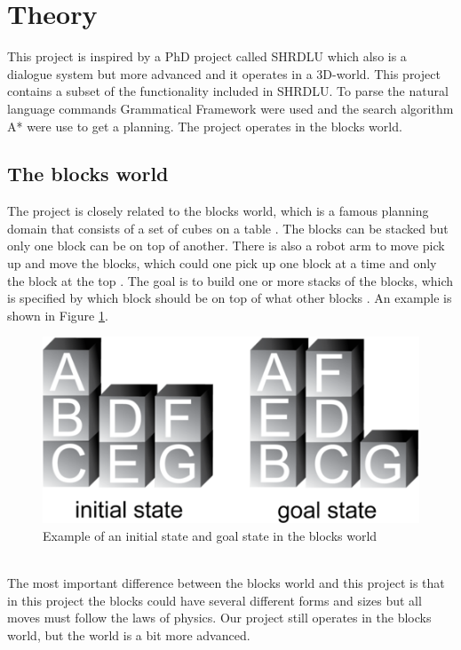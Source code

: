 \section{Theory}
This project is inspired by a PhD project called SHRDLU which also is a dialogue system but more advanced and it operates in a 3D-world. This project contains a subset of the functionality included in SHRDLU. To parse the natural language commands Grammatical Framework were used and the search algorithm A* were use to get a planning. The project operates in the blocks world.

\subsection{The blocks world}
The project is closely related to the blocks world, which is a famous planning domain that consists of a set of cubes on a table \citep{blocksworld_ai}. The blocks can be stacked but only one block can be on top of another. There is also a robot arm to move pick up and move the blocks, which could one pick up one block at a time and only the block at the top \citep{blocksworld_ai}. The goal is to build one or more stacks of the blocks, which is specified by which block should be on top of what other blocks \citep{blocksworld_ai}. An example is shown in Figure \ref{fig:blocksworld}.
\begin{figure}[h!]
\centering
\includegraphics[scale = 0.4]{fig/blocksworld.png}
\caption{Example of an initial state and goal state in the blocks world \citep{blocksworld_fig}}
\label{fig:blocksworld}
\end{figure}\\
The most important difference between the blocks world and this project is that in this project the blocks could have several different forms and sizes but all moves must follow the laws of physics. Our project still operates in the blocks world, but the world is a bit more advanced. 

